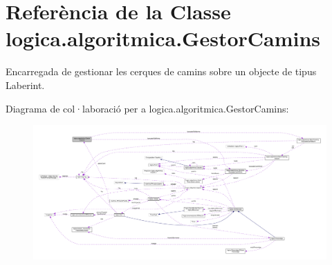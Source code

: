 \hypertarget{classlogica_1_1algoritmica_1_1_gestor_camins}{\section{Referència de la Classe logica.\+algoritmica.\+Gestor\+Camins}
\label{classlogica_1_1algoritmica_1_1_gestor_camins}
}


Encarregada de gestionar les cerques de camins sobre un objecte de tipus Laberint.  




Diagrama de col·laboració per a logica.\+algoritmica.\+Gestor\+Camins\+:
\nopagebreak
\begin{figure}[H]
\begin{center}
\leavevmode
\includegraphics[width=350pt]{classlogica_1_1algoritmica_1_1_gestor_camins__coll__graph}
\end{center}
\end{figure}
